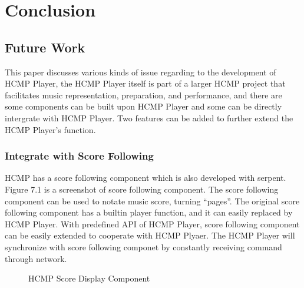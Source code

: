 
\chapter{Conclusion} %



\ifpdf
    \graphicspath{{X/figures/PNG/}{X/figures/PDF/}{X/figures/}}
\else
    \graphicspath{{X/figures/EPS/}{X/figures/}}
\fi


\section{Future Work}

This paper discusses various kinds of issue regarding to the development of 
HCMP Player, the HCMP Player itself is part of a larger HCMP project 
that facilitates music representation, preparation, and performance,
and there are some components can be built upon HCMP Player and some 
can be directly intergrate with HCMP Player. Two
features can be added to further extend the HCMP Player's function. 

\subsection{Integrate with Score Following}
HCMP has a score following component which is also developed with serpent.
Figure 7.1 is a screenshot of score following component. The score following component 
can be used to notate music score, turning 
``pages''. The original score following component has a builtin player function,
and it can easily replaced by HCMP Player. With predefined API of HCMP Player,  
score following component can be easily extended to cooperate with HCMP Plyaer.
The HCMP Player will synchronize with score following componet by constantly 
receiving command through network. 

\begin{figure}[H]
\caption{HCMP Score Display Component}
\label{fig:speciation}
\end{figure}

